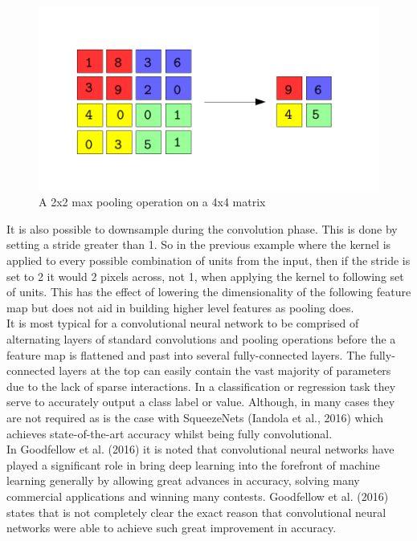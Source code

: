 \documentclass{article}
\begin{document}
\begin{figure}
  \includegraphics[width=\linewidth]{maxpool.pdf}
  \caption{A 2x2 max pooling operation on a 4x4 matrix}
  \label{fig:maxpool}
\end{figure}

It is also possible to downsample during the convolution phase. This is done by setting a stride greater than 1. So in the previous example where the kernel is applied to every possible combination of units from the input, then if the stride is set to 2 it would 2 pixels across, not 1, when applying the kernel to following set of units. This has the effect of lowering the dimensionality of the following feature map but does not aid in building higher level features as pooling does.\\

It is most typical for a convolutional neural network to be comprised of alternating layers of standard convolutions and pooling operations before the a feature map is flattened and past into several fully-connected layers. The fully-connected layers at the top can easily contain the vast majority of parameters due to the lack of sparse interactions. In a classification or regression task they serve to accurately output a class label or value. Although, in many cases they are not required as is the case with SqueezeNets (Iandola et al., 2016) which achieves state-of-the-art accuracy whilst being fully convolutional. \\

In Goodfellow et al. (2016) it is noted that convolutional neural networks have played a significant role in bring deep learning into the forefront of machine learning generally by allowing great advances in accuracy, solving many commercial applications and winning many contests. Goodfellow et al. (2016) states that is not completely clear the exact reason that convolutional neural networks were able to achieve such great improvement in accuracy.\\ 
\end{document}
